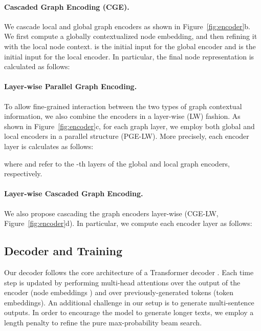 \documentclass[11pt,a4paper]{article}
\begin{document}
\paragraph{Cascaded Graph Encoding (CGE).} We cascade local and global graph encoders as shown in Figure~\ref{fig:encoder}b. We first compute a globally contextualized node embedding, and then refining it with the local node context.  is the initial input for the global encoder and  is the initial input for the local encoder. In particular, the final node representation is calculated as follows:



\paragraph{Layer-wise Parallel Graph Encoding.} To allow fine-grained interaction between the two types of graph contextual information, we also combine the encoders in a layer-wise (LW) fashion. As shown in Figure~\ref{fig:encoder}c, for each graph layer, we employ both global and local encoders in a parallel structure ({\selectfont PGE-LW}). More precisely, each encoder layer is calculates as follows: 

where  and  refer to the -th layers of the global and local graph encoders, respectively.
\paragraph{Layer-wise Cascaded Graph Encoding.} We also propose cascading the graph encoders layer-wise ({\selectfont CGE-LW}, Figure~\ref{fig:encoder}d). In particular, we compute each encoder layer as follows: 
\begin{fleqn}

\end{fleqn}






\vspace{0.5mm}
\subsection{Decoder and Training}
\label{sec:lp}
Our decoder follows the core architecture of a Transformer decoder \cite{NIPS2017_7181}. Each time step  is updated by performing multi-head attentions over the output of the encoder (node embeddings ) and over previously-generated tokens (token embeddings). An additional challenge in our setup is to generate multi-sentence outputs. In order to encourage the model to generate longer texts, we employ a length penalty \cite{DBLP:journals/corr/WuSCLNMKCGMKSJL16} to refine the pure max-probability beam search. 
\end{document}
